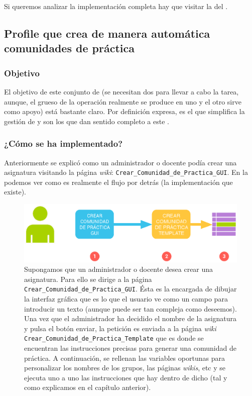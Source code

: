 Si queremos analizar la implementación completa hay que visitar la  del .

\subsection{Profile que crea de manera automática comunidades de práctica} 

\subsubsection{Objetivo}

El objetivo de este conjunto de \profiles{} (se necesitan dos para llevar a cabo la tarea, aunque, el grueso de la operación realmente se produce en uno y el otro sirve como apoyo) está bastante claro. Por definición expresa, es el que simplifica la gestión de \tiki{} y son los que dan sentido completo a este \pfc{}.

\subsubsection{¿Cómo se ha implementado?}

Anteriormente se explicó como un administrador o docente podía crear una asignatura visitando la página \textit{wiki}: \texttt{Crear\_Comunidad\_de\_Practica\_GUI}. En la  podemos ver como es realmente el flujo por detrás (la implementación que existe).

\begin{figure}
\centering
\includegraphics[width=\linewidth]{../graphics/fig_esquema_flujo_profiles_interno.eps}
\caption{Supongamos que un administrador o docente desea crear una asignatura. Para ello se dirige a la página \texttt{Crear\_Comunidad\_de\_Practica\_GUI}. Ésta es la encargada de dibujar la interfaz gráfica que es lo que el usuario ve como un campo para introducir un texto (aunque puede ser tan compleja como deseemos). Una vez que el administrador ha decidido el nombre de la asignatura y pulsa el botón enviar, la petición es enviada a la página \textit{wiki} \texttt{Crear\_Comunidad\_de\_Practica\_Template} que es donde se encuentran las instrucciones precisas para generar una comunidad de práctica. A continuación, se rellenan las variables oportunas para personalizar los nombres de los grupos, las páginas \textit{wikis}, etc y se ejecuta uno a uno las instrucciones que hay dentro de dicho \profile{} (tal y como explicamos en el capítulo anterior).}\label{fig:esquema_flujo_profiles_interno}
\end{figure}

